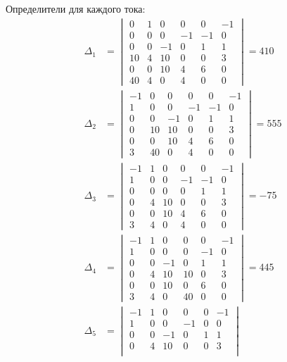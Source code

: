 Определители для каждого тока:
\begin{align}
\Delta_1 &= \begin{vmatrix}
0 &  1 &  0 &  0 &  0 & -1 \\
0 &  0 &  0 & -1 & -1 &  0 \\
0 &  0 & -1 &  0 &  1 &  1 \\
10 &  4 & 10 &  0 &  0 &  3 \\
0 &  0 & 10 &  4 &  6 &  0 \\
40 &  4 &  0 &  4 &  0 &  0
\end{vmatrix} = 410 \\
\Delta_2 &= \begin{vmatrix}
-1 &  0 &  0 &  0 &  0 & -1 \\
 1 &  0 &  0 & -1 & -1 &  0 \\
 0 &  0 & -1 &  0 &  1 &  1 \\
 0 & 10 & 10 &  0 &  0 &  3 \\
 0 &  0 & 10 &  4 &  6 &  0 \\
 3 & 40 &  0 &  4 &  0 &  0
\end{vmatrix} = 555 \\
\Delta_3 &= \begin{vmatrix}
-1 &  1 &  0 &  0 &  0 & -1 \\
 1 &  0 &  0 & -1 & -1 &  0 \\
 0 &  0 &  0 &  0 &  1 &  1 \\
 0 &  4 & 10 &  0 &  0 &  3 \\
 0 &  0 & 10 &  4 &  6 &  0 \\
 3 &  4 &  0 &  4 &  0 &  0
\end{vmatrix} = -75 \\
\Delta_4 &= \begin{vmatrix}
-1 &  1 &  0 &  0 &  0 & -1 \\
 1 &  0 &  0 &  0 & -1 &  0 \\
 0 &  0 & -1 &  0 &  1 &  1 \\
 0 &  4 & 10 & 10 &  0 &  3 \\
 0 &  0 & 10 &  0 &  6 &  0 \\
 3 &  4 &  0 & 40 &  0 &  0
\end{vmatrix} = 445 \\
\Delta_5 &= \begin{vmatrix}
-1 &  1 &  0 &  0 &  0 & -1 \\
 1 &  0 &  0 & -1 &  0 &  0 \\
 0 &  0 & -1 &  0 &  1 &  1 \\
 0 &  4 & 10 &  0 &  0 &  3 \\

\end{vmatrix}
\end{align}
